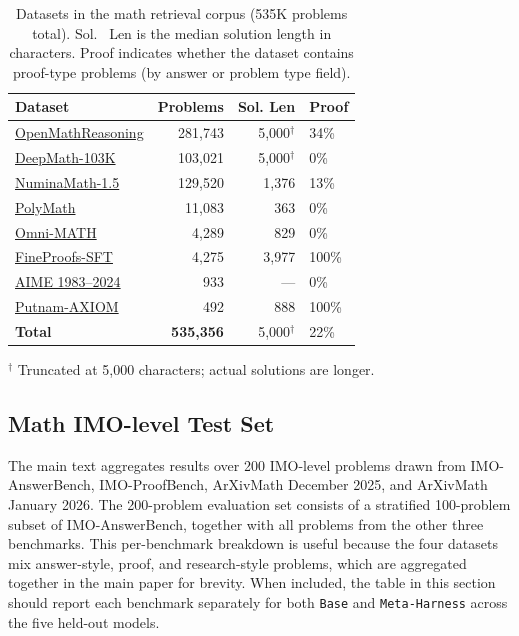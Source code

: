 \begin{table}[h]
\centering
\begin{tabular}{lrrl}
\toprule
\textbf{Dataset} & \textbf{Problems} & \textbf{Sol. Len} & \textbf{Proof} \\
\midrule
\href{https://huggingface.co/datasets/nvidia/OpenMathReasoning}{OpenMathReasoning} & 281,743 & 5{,}000$^\dagger$ & 34\% \\
\href{https://huggingface.co/datasets/zwhe99/DeepMath-103K}{DeepMath-103K}     & 103,021 & 5{,}000$^\dagger$ & 0\%  \\
\href{https://huggingface.co/datasets/AI-MO/NuminaMath-1.5}{NuminaMath-1.5}    & 129,520 & 1{,}376           & 13\% \\
\href{https://huggingface.co/datasets/AIMO-Corpus/PolyMath}{PolyMath}          &  11,083 &     363           & 0\%  \\
\href{https://huggingface.co/datasets/KbsdJames/Omni-MATH}{Omni-MATH}         &   4,289 &     829           & 0\%  \\
\href{https://huggingface.co/datasets/SPIderman5/FineProofs-SFT}{FineProofs-SFT}    &   4,275 &   3{,}977         & 100\% \\
\href{https://huggingface.co/datasets/gneubig/aime-1983-2024}{AIME 1983--2024}   &     933 &     ---           & 0\%  \\
\href{https://huggingface.co/datasets/Putnam-AXIOM/putnam-axiom-dataset-v1}{Putnam-AXIOM}      &     492 &     888           & 100\% \\
\midrule
\textbf{Total}    & \textbf{535,356} & 5{,}000$^\dagger$ & 22\% \\
\bottomrule
\end{tabular}

\smallskip
{\footnotesize $^\dagger$ Truncated at 5{,}000 characters; actual solutions are longer.}
\caption{
    Datasets in the math retrieval corpus (535K problems total).
    Sol. \ Len is the median solution length in characters.
    Proof indicates whether the dataset contains proof-type problems (by answer or problem type field).}
\label{tab:math-corpus}
\end{table}

\subsection{Math IMO-level Test Set}
\label{app:math-per-dataset}

The main text aggregates results over 200 IMO-level problems drawn from IMO-AnswerBench, IMO-ProofBench, ArXivMath December 2025, and ArXivMath January 2026.
The 200-problem evaluation set consists of a stratified 100-problem subset of IMO-AnswerBench, together with all problems from the other three benchmarks.
This per-benchmark breakdown is useful because the four datasets mix answer-style, proof, and research-style problems, which are aggregated together in the main paper for brevity.
When included, the table in this section should report each benchmark separately for both \texttt{Base} and \texttt{Meta-Harness} across the five held-out models.

